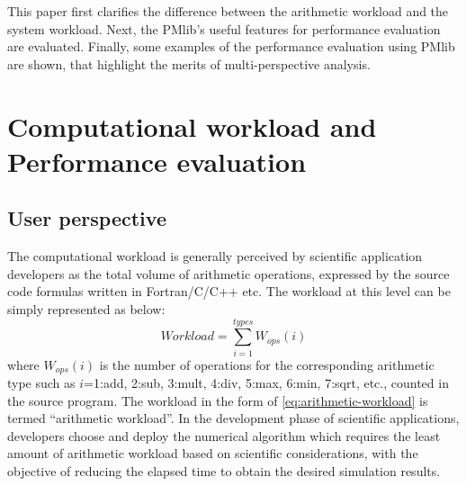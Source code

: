 \documentclass[conference]{IEEEtran}
\begin{document}
This paper first clarifies the difference between the arithmetic workload and
the system workload.
Next, the PMlib's useful features for performance evaluation are evaluated.
Finally, some examples of the performance evaluation using PMlib
are shown, that highlight the merits of multi-perspective analysis.

\section{Computational workload and Performance evaluation}
\label{workload-evaluation}

\subsection{User perspective}
\label{subsection:user-perspective}

The computational workload is generally perceived by scientific application
developers as the total volume of arithmetic operations,
expressed by the source code formulas written in Fortran/C/C++ etc.
The workload at this level can be simply represented as below:
\begin{equation}\label{eq:arithmetic-workload}
	Workload = \sum_{i=1}^{types} W_{ops}(i)
\end{equation}
where $ W_{ops}(i) $ is the number of operations for the
corresponding arithmetic type such as
$i$=1:add, 2:sub, 3:mult, 4:div, 5:max, 6:min, 7:sqrt, etc.,
counted in the source program.
The workload in the form of \eqref{eq:arithmetic-workload}
is termed ``arithmetic workload''.
In the development phase of scientific applications, developers
choose and deploy the numerical algorithm which requires the least
amount of arithmetic workload based on scientific considerations,
with the objective of reducing the elapsed time to obtain the desired
simulation results.
\end{document}
